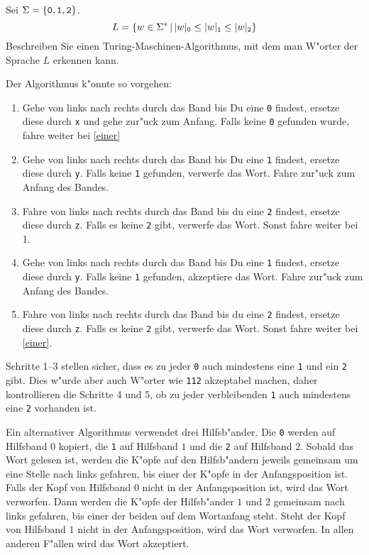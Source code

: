 Sei $\Sigma=\{{\tt 0},{\tt 1},{\tt 2}\}$.
\[
L=\{
w\in\Sigma^*
\,|\,
|w|_{\tt 0} \le
|w|_{\tt 1} \le
|w|_{\tt 2}
\}
\]
Beschreiben Sie einen Turing-Maschinen-Algorithmus, mit dem man W"orter der
Sprache $L$ erkennen kann.

\begin{loesung}
Der Algorithmus k"onnte so vorgehen:
\begin{enumerate}
\item Gehe von links nach rechts durch das Band bis Du eine
{\tt 0} findest, ersetze diese durch {\tt x} und gehe zur"uck
zum Anfang. Falls keine {\tt 0} gefunden wurde, fahre weiter bei
\ref{einer}
\item
Gehe von links nach rechts durch das Band bis Du eine
{\tt 1} findest, ersetze diese durch {\tt y}. Falls keine {\tt 1}
gefunden, verwerfe das Wort. Fahre zur"uck zum Anfang des Bandes.
\item Fahre von links nach rechts durch das Band bis du eine
{\tt 2} findest, ersetze diese durch {\tt z}. Falls es keine {\tt 2}
gibt, verwerfe das Wort. Sonst fahre weiter bei 1.
\item\label{einer}
Gehe von links nach rechts durch das Band bis Du eine
{\tt 1} findest, ersetze diese durch {\tt y}. Falls keine {\tt 1}
gefunden, akzeptiere das Wort. Fahre zur"uck zum Anfang des Bandes.
\item Fahre von links nach rechts durch das Band bis du eine
{\tt 2} findest, ersetze diese durch {\tt z}. Falls es keine {\tt 2}
gibt, verwerfe das Wort. Sonst fahre weiter bei \ref{einer}.
\end{enumerate}
Schritte 1--3 stellen sicher, dass es zu jeder {\tt 0} auch mindestens
eine {\tt 1} und ein {\tt 2} gibt. Dies w"urde aber auch W"orter wie
{\tt 112} akzeptabel machen, daher kontrollieren die Schritte 4 und 5,
ob zu jeder verbleibenden {\tt 1} auch mindestens eine {\tt 2}
vorhanden ist.

Ein alternativer Algorithmus verwendet drei Hilfsb"ander.  Die {\tt 0}
werden auf Hilfsband $0$ kopiert, die {\tt 1} auf Hilfsband $1$ und
die {\tt 2} auf Hilfsband 2. Sobald das Wort gelesen ist, werden
die K"opfe auf den Hilfsb"andern jeweils gemeinsam um eine Stelle nach
links gefahren, bis einer der K"opfe in der Anfangsposition ist.
Falls der Kopf von Hilfsband $0$ nicht in der Anfangsposition ist,
wird das Wort verworfen. Dann werden die K"opfe der Hilfsb"ander $1$
und $2$ gemeinsam nach links gefahren, bis einer der beiden auf dem
Wortanfang steht. Steht der Kopf von Hilfsband $1$ nicht in der
Anfangsposition, wird das Wort verworfen. In allen anderen F"allen
wird das Wort akzeptiert.
\end{loesung}
